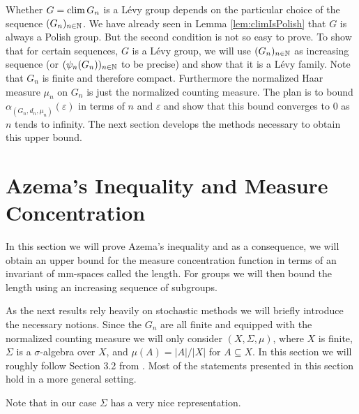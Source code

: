 Whether $G=\operatorname{clim} G_n$ is a L\'evy group depends on the particular choice of the sequence $(G_n)_{n\in\mathbb{N}}$. We have already seen in Lemma \ref{lem:climIsPolish} that $G$ is always a Polish group. But the second condition is not so easy to prove.
To show that for certain sequences, $G$ is a L\'evy group, we will use $(G_n)_{n\in\mathbb{N}}$ as increasing sequence (or $(\psi_n(G_n))_{n\in\mathbb{N}}$ to be precise) and show that it is a L\'evy family. Note that $G_n$ is finite and therefore compact. Furthermore the normalized Haar measure $\mu_n$ on $G_n$ is just the normalized counting measure. The plan is to bound $\alpha_{(G_n,d_n,\mu_n)}(\varepsilon)$ in terms of $n$ and $\varepsilon$ and show that this bound converges to 0 as $n$ tends to infinity. 
The next section develops the methods necessary to obtain this upper bound.
		
		
\section{Azema's Inequality and Measure Concentration}\label{sec:azema}
In this section we will prove Azema's inequality and as a consequence, we will obtain an upper bound for the measure concentration function in terms of an invariant of mm-spaces called the length. For groups we will then bound the length using an increasing sequence of subgroups. 

As the next results rely heavily on stochastic methods we will briefly introduce the necessary notions. Since the $G_n$ are all finite and equipped with the normalized counting measure we will only consider  $(X,\Sigma,\mu)$, where $X$ is finite, $\Sigma$ is a $\sigma$-algebra over $X$, and $\mu(A)=|A|/|X|$ for $A\subseteq X$. In this section we will roughly follow Section 3.2 from \cite{Azema}. Most of the statements presented in this section hold in a more general setting. 

Note that in our case $\Sigma$ has a very nice representation.%
		
